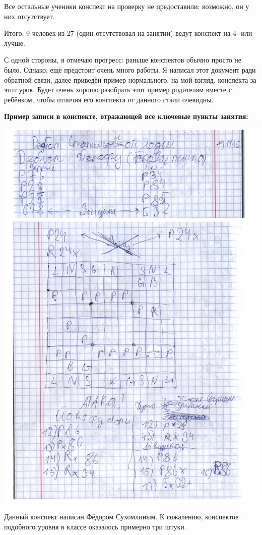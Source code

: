 \documentclass[10pt,a4paper]{article}
\begin{document}
\bigskip\noindent
Все остальные ученики конспект на проверку не предоставили; возможно, он у них отсутствует.

\medskip\noindent
Итого: 9 человек из 27 (один отсутствовал на занятии) ведут конспект на 4- или лучше.

\medskip\noindent
С одной стороны, я отмечаю прогресс: раньше конспектов обычно просто не было.
Однако, ещё предстоит очень много работы. 
Я написал этот документ ради обратной
связи, далее приведён пример нормального, на мой взгляд, конспекта
за этот урок. Будет очень хорошо разобрать этот пример родителям вместе с ребёнком, 
чтобы отличия его конспекта от данного стали очевидны.


\begin{center}\bfseries Пример записи в конспекте, отражающей все ключевые пункты занятия:

\bigskip
\includegraphics[scale=0.75]{suhomlin-total.jpg}\end{center}

Данный конспект написан Фёдором Сухомлиным.
К сожалению, конспектов подобного уровня в классе оказалось примерно три штуки.
\end{document}
